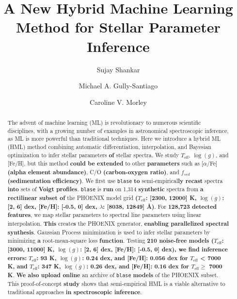 \documentclass[twocolumn, linenumbers]{aastex631}
\begin{document}
\title{A New Hybrid Machine Learning Method for Stellar Parameter Inference}
\author[0000-0002-2290-6810]{Sujay Shankar}
\author[0000-0002-4020-3457]{Michael A. Gully-Santiago}
\author[0000-0002-4404-0456]{Caroline V. Morley}


\begin{abstract}
    The advent of machine learning (ML) is revolutionary to numerous scientific disciplines, with a growing number of examples in astronomical spectroscopic inference, as ML is more powerful than traditional techniques.
    Here we introduce a hybrid ML (HML) method combin{ing} automatic differentiation, interpolation, and Bayesian optimization to infer stellar parameters \textbf{of} stellar spectra.
    We study $T_{\mathrm{eff}}$, $\log(g)$, and [Fe/H], but this method \textbf{could be extended} to other \textbf{parameters} such as [$\alpha$/Fe] \textbf{(alpha element abundance)}, C/O \textbf{(carbon-oxygen ratio)}, and $f_{sed}$ \textbf{(sedimentation efficiency)}.
    We first use \texttt{blase} \textbf{to} semi-empirical\textbf{ly recast} spectra \textbf{into} sets of \textbf{Voigt profiles}.
    \texttt{blase} is \textbf{run} on 1,314 \textbf{synthetic} spectra from \textbf{a rectilinear subset of} the PHOENIX model grid \textbf{($T_\text{eff}$: [2300, 12000] K, $\log(g)$: [2, 6] dex, [Fe/H]: [-0.5, 0] dex, $\lambda$: [8038, 12849] \AA)}.
    For \textbf{128,723 detected features}, we map stellar parameters to spectral line parameters using linear interpolation.
    \textbf{This} create\textbf{s} the PHOENIX generator, \textbf{enabling parallelized spectral synthesis}.
    Gaussian Process minimization is used to infer stellar parameters by minimizing \textbf{a} root-mean-square loss \textbf{function}.
    Testing \textbf{210 noise-free models ($T_{\mathrm{eff}}$: [3000, 11000] K, $\log(g)$: [2, 6] dex, [Fe/H]: [-0.5, 0] dex), we find inference errors:} $T_{\mathrm{eff}}$\textbf{: 93 K, $\log(g)$: 0.24 dex, and [Fe/H]: 0.056 dex for $T_\text{eff}$ < 7000 K, and $T_{\mathrm{eff}}$: 347 K, $\log(g)$: 0.26 dex, and [Fe/H]: 0.16 dex for $T_\text{eff} \ge$ 7000 K}.
    \textbf{We also upload online} an archive of \texttt{blase} \textbf{models} of the PHOENIX subset.
    This proof-of-concept \textbf{study} shows that semi-empirical HML is a viable alternative to traditional approaches \textbf{in spectroscopic inference}.
\end{abstract}
\end{document}
